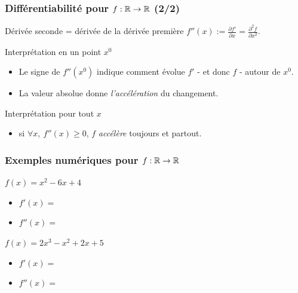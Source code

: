 \documentclass{beamer}
\newcommand{\R}{{\ensuremath\mathbb{R}}}
\begin{document}
\begin{frame}
  \frametitle{Différentiabilité pour $f: \R \rightarrow \R$ (2/2) }

  \begin{block}{Dérivée seconde = dérivée de la dérivée première}
    $f''(x) := \frac{\partial f'}{\partial x} = \frac{\partial ^{2}f}{\partial x^{2}}$.
  \end{block}

  \begin{block}{Interprétation en un point $x^0$}
    \begin{itemize}
    \item Le signe de $f''(x^0)$ indique comment évolue $f'$ - et donc $f$ - autour de $x^0$. 
    \item La valeur absolue donne \emph{l'accélération} du changement.
    \end{itemize}
  \end{block}

  \begin{block}{Interprétation pour tout $x$}
    \begin{itemize}
    \item si $\forall x, \ f''(x) \geq 0$,
      $f$ \emph{accélère} toujours et partout. 
    \end{itemize}
  \end{block}
  
\end{frame}

\begin{frame}
  \frametitle{Exemples numériques pour $f:\R \rightarrow \R$}

  \begin{block}{$f(x) = x^2 - 6x + 4$}
    \begin{itemize}
      \item $f'(x) =$\only<1>{?}
      \item $f''(x) =$ 
    \end{itemize}
  \end{block}

  \begin{block}{$f(x) = 2x^3 - x^2 + 2x + 5$}
    \begin{itemize}
      \item $f'(x) =$\only<1>{?}
      \item $f''(x) = $
    \end{itemize}
  \end{block}
  
\end{frame}
\end{document}
